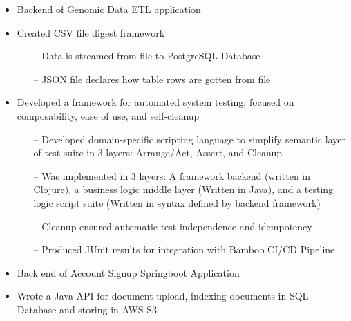 \documentclass[10pt,a4paper]{altacv}
\begin{document}
\begin{itemize}
    \item Backend of Genomic Data ETL application
    \item Created CSV file digest framework
    \begin{itemize}
      \item[--] Data is streamed from file to PostgreSQL Database
      \item[--] JSON file declares how table rows are gotten from file
    \end{itemize}
    \item Developed a framework for automated system testing; focused on composability, ease of use, and self-cleanup
    \begin{itemize}
      \item[--] Developed domain-specific scripting language to simplify semantic layer of test suite in 3 layers: Arrange/Act, Assert, and Cleanup
      \item[--] Was implemented in 3 layers: A framework backend (written in Clojure), a business logic middle layer (Written in Java), and a testing logic script suite (Written in syntax defined by backend framework)
      \item[--] Cleanup ensured automatic test independence and idempotency
      \item[--] Produced JUnit results for integration with Bamboo CI/CD Pipeline
    \end{itemize}
\end{itemize}

\bigskip


\divider

\begin{itemize}
    \item  Back end of Account Signup Springboot Application
    \item Wrote a Java API for document upload, indexing documents in SQL Database and storing in AWS S3
\end{itemize}
\end{document}
